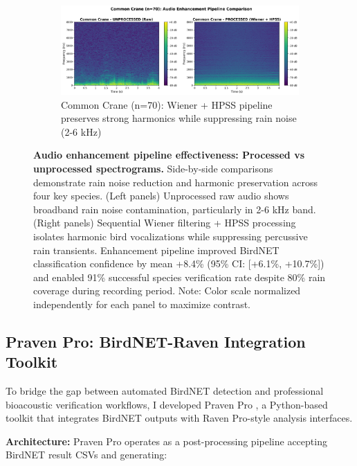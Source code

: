 \documentclass[twocolumn]{article}
\begin{document}
\begin{figure}[p]
\vspace{0.8cm}

\begin{subfigure}{0.78\textwidth}
\centering
\includegraphics[width=\textwidth]{figures/comparison_common_crane.png}
\caption{Common Crane (n=70): Wiener + HPSS pipeline preserves strong harmonics while suppressing rain noise (2-6 kHz)}
\end{subfigure}

\caption{\textbf{Audio enhancement pipeline effectiveness: Processed vs unprocessed spectrograms.} Side-by-side comparisons demonstrate rain noise reduction and harmonic preservation across four key species. (Left panels) Unprocessed raw audio shows broadband rain noise contamination, particularly in 2-6 kHz band. (Right panels) Sequential Wiener filtering + HPSS processing isolates harmonic bird vocalizations while suppressing percussive rain transients. Enhancement pipeline improved BirdNET classification confidence by mean +8.4\% (95\% CI: [+6.1\%, +10.7\%]) and enabled 91\% successful species verification rate despite 80\% rain coverage during recording period. Note: Color scale normalized independently for each panel to maximize contrast.}
\label{fig:processing_comparison}
\end{figure}

\subsection{Praven Pro: BirdNET-Raven Integration Toolkit}

To bridge the gap between automated BirdNET detection and professional bioacoustic verification workflows, I developed Praven Pro \citep{Redpath2025}, a Python-based toolkit that integrates BirdNET outputs with Raven Pro-style analysis interfaces.

\textbf{Architecture:} Praven Pro operates as a post-processing pipeline accepting BirdNET result CSVs and generating:
\end{document}
